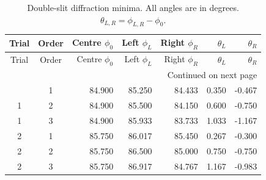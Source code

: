 \documentclass[12pt,letterpaper]{article}
\begin{document}
\begin{longtable}{ccrrrrr}
\caption{Double-slit diffraction minima. All angles are in degrees. $\theta_{L,R}=\phi_{L,R}-\phi_0$.}\label{tab:diffraction-2}\\
\toprule
Trial & Order & Centre $\phi_0$ & Left $\phi_L$ & Right $\phi_R$ & $\theta_L$ & $\theta_R$ \\
\midrule
\endfirsthead
\toprule
Trial & Order & Centre $\phi_0$ & Left $\phi_L$ & Right $\phi_R$ & $\theta_L$ & $\theta_R$ \\
\midrule
\endhead
\midrule
\multicolumn{7}{r}{Continued on next page} \\
\endfoot
\bottomrule
\endlastfoot
1 & 1 & 84.900 & 85.250 & 84.433 & 0.350 & -0.467 \\
1 & 2 & 84.900 & 85.500 & 84.150 & 0.600 & -0.750 \\
1 & 3 & 84.900 & 85.933 & 83.733 & 1.033 & -1.167 \\
\midrule
2 & 1 & 85.750 & 86.017 & 85.450 & 0.267 & -0.300 \\
2 & 2 & 85.750 & 86.500 & 85.000 & 0.750 & -0.750 \\
2 & 3 & 85.750 & 86.917 & 84.767 & 1.167 & -0.983 \\
\end{longtable}
\end{document}
